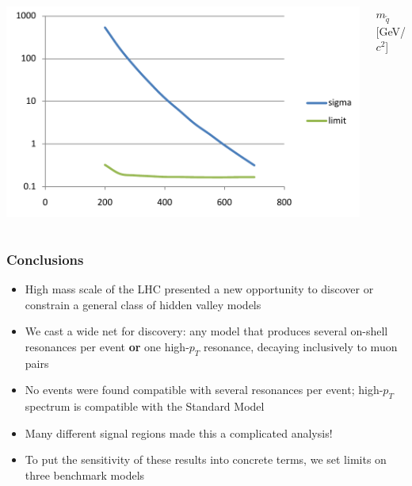 \documentclass[compress]{beamer}
\begin{document}
\begin{frame}
\begin{columns}
\includegraphics[width=\linewidth]{squarklimits_hh.png}

$m_{\tilde{q}}$ [GeV/$c^2$]
\end{columns}
\end{frame}

\begin{frame}
\frametitle{Conclusions}

\begin{itemize}\setlength{\itemsep}{0.5 cm}
\item High mass scale of the LHC presented a new opportunity to
  discover or constrain a general class of hidden valley models

\item We cast a wide net for discovery: any model that produces
  several on-shell resonances per event {\bf or} one high-$p_T$
  resonance, decaying inclusively to muon pairs

\item No events were found compatible with several resonances per
  event; high-$p_T$ spectrum is compatible with the Standard Model

\item Many different signal regions made this a complicated analysis!

\item To put the sensitivity of these results into concrete terms, we
  set limits on three benchmark models
\end{itemize}

\label{numpages}
\end{frame}
\end{document}
